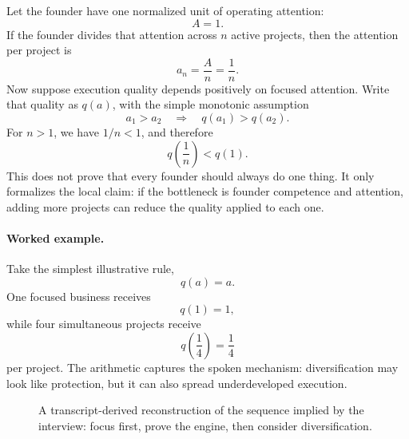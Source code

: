 Let the founder have one normalized unit of operating attention:
\begin{equation}
A = 1.
\end{equation}
If the founder divides that attention across \(n\) active projects, then the attention per project is
\begin{equation}
a_n = \frac{A}{n} = \frac{1}{n}.
\end{equation}
Now suppose execution quality depends positively on focused attention. Write that quality as \(q(a)\), with the simple monotonic assumption
\begin{equation}
a_1>a_2
\quad \Longrightarrow \quad
q(a_1)>q(a_2).
\end{equation}
For \(n>1\), we have \(1/n<1\), and therefore
\begin{equation}
q\!\left(\frac{1}{n}\right) < q(1).
\end{equation}
This does not prove that every founder should always do one thing. It only formalizes the local claim: if the bottleneck is founder competence and attention, adding more projects can reduce the quality applied to each one.

\paragraph{Worked example.}
Take the simplest illustrative rule,
\begin{equation}
q(a)=a.
\end{equation}
One focused business receives
\begin{equation}
q(1)=1,
\end{equation}
while four simultaneous projects receive
\begin{equation}
q\!\left(\frac{1}{4}\right)=\frac{1}{4}
\end{equation}
per project. The arithmetic captures the spoken mechanism: diversification may look like protection, but it can also spread underdeveloped execution.

\begin{figure}
\centering
{}
\caption{A transcript-derived reconstruction of the sequence implied by the interview: focus first, prove the engine, then consider diversification.}
\end{figure}

